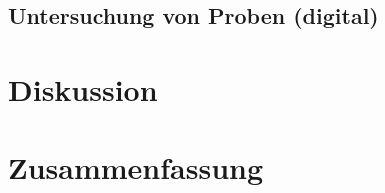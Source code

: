 \documentclass[12pt,a4paper,twoside]{article}
\begin{document}
\subsection{Untersuchung von Proben (digital)}





\section{Diskussion} %


\section{Zusammenfassung} %


\printbibliography[heading=bibintoc]
\end{document}
